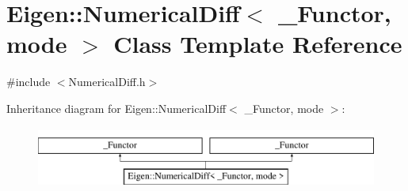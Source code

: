 \hypertarget{class_eigen_1_1_numerical_diff}{}\section{Eigen\+:\+:Numerical\+Diff$<$ \+\_\+\+Functor, mode $>$ Class Template Reference}
\label{class_eigen_1_1_numerical_diff}


{\ttfamily \#include $<$Numerical\+Diff.\+h$>$}

Inheritance diagram for Eigen\+:\+:Numerical\+Diff$<$ \+\_\+\+Functor, mode $>$\+:\begin{figure}[H]
\begin{center}
\leavevmode
\includegraphics[height=2.000000cm]{class_eigen_1_1_numerical_diff}
\end{center}
\end{figure}
